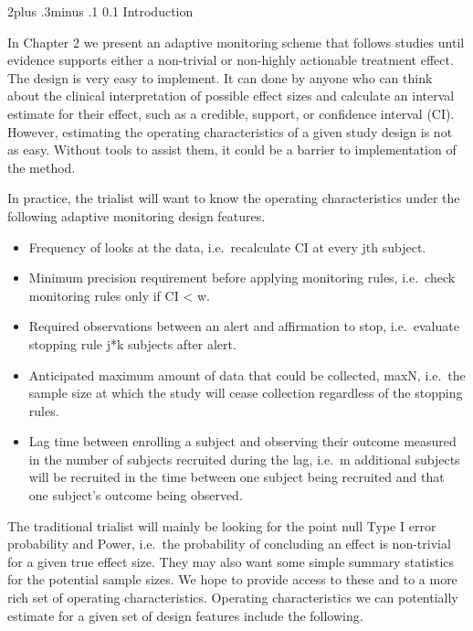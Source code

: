 \documentclass[12pt,oneside]{book}
\makeatletter
\providecommand{\tightlist}{%
  \setlength{\itemsep}{0pt}\setlength{\parskip}{0pt}}
\newlength{\li}\setlength{\li}{14.48pt}
\newlength{\di}\setlength{\di}{-3.5mm}
\renewcommand\section{ \@startsection {section}{1}{\z@}%
    {2\@bls  plus .3\@bls minus .1\@bls}%
    {0.1\@bls}%
    {\centering\normalfont}}
\theoremstyle{definition}
\theoremstyle{definition}
\theoremstyle{definition}
\theoremstyle{remark}
\makeatother
\begin{document}
\hypertarget{introduction-3}{%
\section{Introduction}\label{introduction-3}}

In Chapter 2 we present an adaptive monitoring scheme that follows
studies until evidence supports either a non-trivial or non-highly
actionable treatment effect. The design is very easy to implement. It
can done by anyone who can think about the clinical interpretation of
possible effect sizes and calculate an interval estimate for their
effect, such as a credible, support, or confidence interval (CI).
However, estimating the operating characteristics of a given study
design is not as easy. Without tools to assist them, it could be a
barrier to implementation of the method.

In practice, the trialist will want to know the operating
characteristics under the following adaptive monitoring design features.

\begin{itemize}
\tightlist
\item
  Frequency of looks at the data, i.e.~recalculate CI at every jth
  subject.
\item
  Minimum precision requirement before applying monitoring rules,
  i.e.~check monitoring rules only if \textbar{}CI\textbar{} \textless{}
  w.
\item
  Required observations between an alert and affirmation to stop,
  i.e.~evaluate stopping rule j*k subjects after alert.
\item
  Anticipated maximum amount of data that could be collected, maxN,
  i.e.~the sample size at which the study will cease collection
  regardless of the stopping rules.
\item
  Lag time between enrolling a subject and observing their outcome
  measured in the number of subjects recruited during the lag, i.e.~m
  additional subjects will be recruited in the time between one subject
  being recruited and that one subject's outcome being observed.
\end{itemize}

The traditional trialist will mainly be looking for the point null Type
I error probability and Power, i.e.~the probability of concluding an
effect is non-trivial for a given true effect size. They may also want
some simple summary statistics for the potential sample sizes. We hope
to provide access to these and to a more rich set of operating
characteristics. Operating characteristics we can potentially estimate
for a given set of design features include the following.
\end{document}
